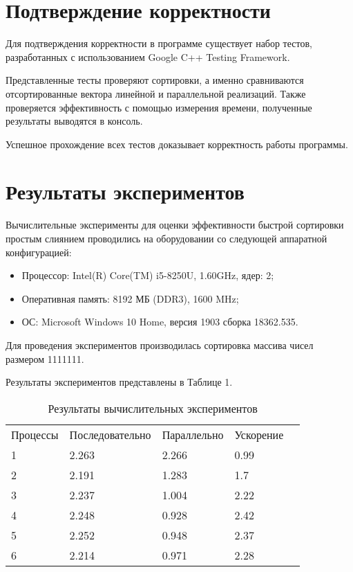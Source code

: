 \documentclass{report}
\begin{document}
\newpage

\section*{Подтверждение корректности}
Для подтверждения корректности в программе существует набор тестов, разработанных с использованием Google C++ Testing Framework.
\par 
Представленные тесты проверяют сортировки, а именно сравниваются отсортированные вектора линейной и параллельной реализаций. Также проверяется эффективность с помощью измерения времени, полученные результаты выводятся в консоль.
\par Успешное прохождение всех тестов доказывает корректность работы программы.
\newpage

\section*{Результаты экспериментов}
Вычислительные эксперименты для оценки эффективности быстрой сортировки простым слиянием проводились на оборудовании со следующей аппаратной конфигурацией:

\begin{itemize}
\item Процессор: Intel(R) Core(TM) i5-8250U, 1.60GHz, ядер: 2;
\item Оперативная память: 8192 МБ (DDR3), 1600 MHz;
\item ОС: Microsoft Windows 10 Home, версия 1903 сборка 18362.535.
\end{itemize}

\par Для проведения экспериментов производилась сортировка массива чисел размером 1111111.
\par Результаты экспериментов представлены в Таблице 1.

\begin{table}[!h]
\caption{Результаты вычислительных экспериментов}
\centering
\begin{tabular}{lllll}
Процессы & Последовательно & Параллельно & Ускорение  \\
1        & 2.263          & 2.266     & 0.99       \\
2        & 2.191         & 1.283     & 1.7       \\
3        & 2.237         & 1.004     & 2.22       \\
4        & 2.248         & 0.928     & 2.42       \\
5        & 2.252         & 0.948     & 2.37       \\
6        & 2.214         & 0.971     & 2.28
\end{tabular}
\end{table}
\end{document}
